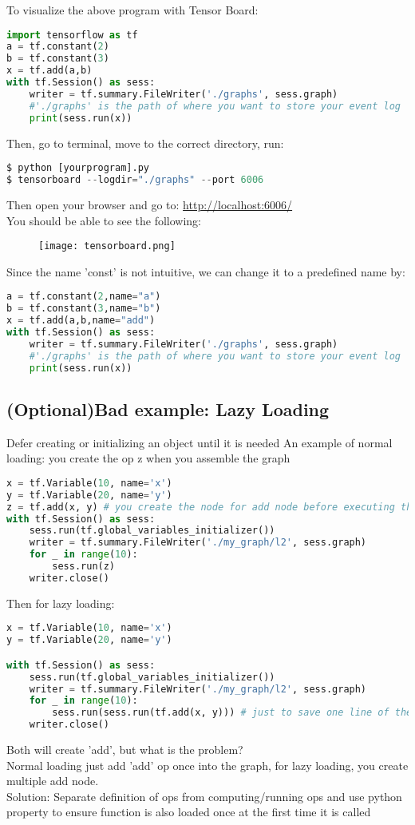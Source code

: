 \documentclass{article}
\begin{document}
	\noindent To visualize the above program with Tensor Board:
\begin{lstlisting}[language=Python,morekeywords ={as}]
import tensorflow as tf
a = tf.constant(2)
b = tf.constant(3)
x = tf.add(a,b)
with tf.Session() as sess:
	writer = tf.summary.FileWriter('./graphs', sess.graph)
	#'./graphs' is the path of where you want to store your event log
	print(sess.run(x))
\end{lstlisting}	
	Then, go to terminal, move to the correct directory, run:
\begin{lstlisting}[numbers=none,language=Python]
$ python [yourprogram].py
$ tensorboard --logdir="./graphs" --port 6006
\end{lstlisting}
	Then open your browser and go to: \url{http://localhost:6006/}\\
	You should be able to see the following:
	\begin{figure}[H]
		\centering
		\texttt{[image: tensorboard.png]}
	\end{figure}
	\noindent Since the name 'const' is not intuitive, we can change it to a predefined name by:
\begin{lstlisting}[language=Python,morekeywords ={as}]
a = tf.constant(2,name="a")
b = tf.constant(3,name="b")
x = tf.add(a,b,name="add")
with tf.Session() as sess:
	writer = tf.summary.FileWriter('./graphs', sess.graph)
	#'./graphs' is the path of where you want to store your event log
	print(sess.run(x))
\end{lstlisting}
	\medskip
	\subsection{(Optional)Bad example: Lazy Loading}
	Defer creating or initializing an object until it is needed
	An example of normal loading: you create the op z when you assemble the graph
\begin{lstlisting}[language=Python,morekeywords ={as}]
x = tf.Variable(10, name='x')
y = tf.Variable(20, name='y')
z = tf.add(x, y) # you create the node for add node before executing the graph
with tf.Session() as sess:
	sess.run(tf.global_variables_initializer())
	writer = tf.summary.FileWriter('./my_graph/l2', sess.graph)
	for _ in range(10):
		sess.run(z)
	writer.close()	
\end{lstlisting}	
	Then for lazy loading:
\begin{lstlisting}[language=Python,morekeywords ={as}]
x = tf.Variable(10, name='x')
y = tf.Variable(20, name='y')

with tf.Session() as sess:
	sess.run(tf.global_variables_initializer())
	writer = tf.summary.FileWriter('./my_graph/l2', sess.graph)
	for _ in range(10):
		sess.run(sess.run(tf.add(x, y))) # just to save one line of the code
	writer.close()	
\end{lstlisting}
Both will create 'add', but what is the problem?\\
Normal loading just add 'add' op once into the graph, for lazy loading, you create multiple add node.\\
Solution: Separate definition of ops from computing/running ops and use python property to ensure function is also loaded once at the first time it is called
\end{document}
